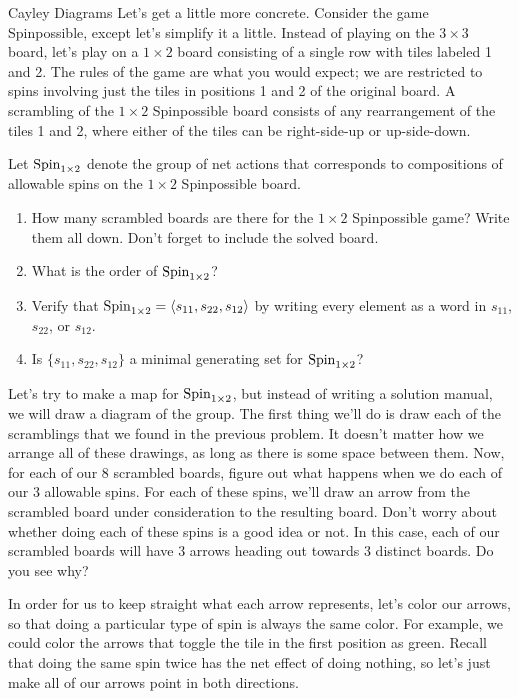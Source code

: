 \begin{section}{Cayley Diagrams}
Let's get a little more concrete.  Consider the game Spinpossible, except let's simplify it a little.  Instead of playing on the $3\times 3$ board, let's play on a $1\times 2$ board consisting of a single row with tiles labeled 1 and 2.  The rules of the game are what you would expect; we are restricted to spins involving just the tiles in positions 1 and 2 of the original board.  A scrambling of the $1\times 2$ Spinpossible board consists of any rearrangement of the tiles 1 and 2, where either of the tiles can be right-side-up or up-side-down.  

\begin{problem}
Let $\operatorname{Spin}_{1\times 2}$ denote the group of net actions that corresponds to compositions of allowable spins on the $1\times 2$ Spinpossible board.
\begin{enumerate}[label=\textrm{(\alph*)}]
\item How many scrambled boards are there for the $1\times 2$ Spinpossible game?  Write them all down. Don't forget to include the solved board.
\item What is the order of $\operatorname{Spin}_{1\times 2}$?
\item Verify that $\operatorname{Spin}_{1\times 2}=\langle s_{11}, s_{22}, s_{12}\rangle$ by writing every element as a word in $s_{11}$, $s_{22}$, or $s_{12}$.
\item Is $\{s_{11}, s_{22}, s_{12}\}$ a minimal generating set for $\operatorname{Spin}_{1\times 2}$?
\end{enumerate}
\end{problem}

Let's try to make a map for $\operatorname{Spin}_{1\times 2}$, but instead of writing a solution manual, we will draw a diagram of the group.  The first thing we'll do is draw each of the scramblings that we found in the previous problem.  It doesn't matter how we arrange all of these drawings, as long as there is some space between them.  Now, for each of our 8 scrambled boards, figure out what happens when we do each of our 3 allowable spins.  For each of these spins, we'll draw an arrow from the scrambled board under consideration to the resulting board.  Don't worry about whether doing each of these spins is a good idea or not.  In this case, each of our scrambled boards will have 3 arrows heading out towards 3 distinct boards.  Do you see why?  

In order for us to keep straight what each arrow represents, let's color our arrows, so that doing a particular type of spin is always the same color.  For example, we could color the arrows that toggle the tile in the first position as green.  Recall that doing the same spin twice has the net effect of doing nothing, so let's just make all of our arrows point in both directions.


\end{section}

